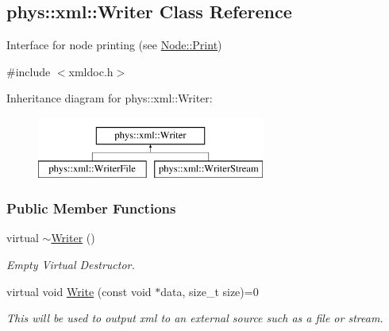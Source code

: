 \hypertarget{classphys_1_1xml_1_1Writer}{
\subsection{phys::xml::Writer Class Reference}
\label{d2/d28/classphys_1_1xml_1_1Writer}
}


Interface for node printing (see \hyperlink{classphys_1_1xml_1_1Node_adbe10968a804a94552e1dc8223744406}{Node::Print})  




{\ttfamily \#include $<$xmldoc.h$>$}

Inheritance diagram for phys::xml::Writer:\begin{figure}[H]
\begin{center}
\leavevmode
\includegraphics[height=2.000000cm]{d2/d28/classphys_1_1xml_1_1Writer}
\end{center}
\end{figure}
\subsubsection*{Public Member Functions}
\begin{DoxyCompactItemize}
\item 
\hypertarget{classphys_1_1xml_1_1Writer_a527c2e01738b1e570d08674eada21800}{
virtual \hyperlink{classphys_1_1xml_1_1Writer_a527c2e01738b1e570d08674eada21800}{$\sim$Writer} ()}
\label{d2/d28/classphys_1_1xml_1_1Writer_a527c2e01738b1e570d08674eada21800}

\begin{DoxyCompactList}\small\item\em Empty Virtual Destructor. \item\end{DoxyCompactList}\item 
virtual void \hyperlink{classphys_1_1xml_1_1Writer_ab6d4758ab53743f236eb64d5b2dd7e9e}{Write} (const void $\ast$data, size\_\-t size)=0
\begin{DoxyCompactList}\small\item\em This will be used to output xml to an external source such as a file or stream. \item\end{DoxyCompactList}\end{DoxyCompactItemize}


